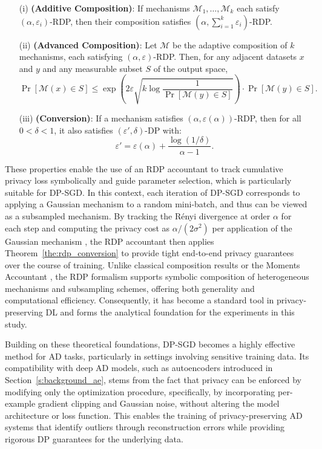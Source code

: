 \begin{theorem}\label{the:rdp_conversion}
\leavevmode
\begin{itemize}
    \item[(i)] \textbf{(Additive Composition)}: If mechanisms $\mathcal{M}_1, \ldots, \mathcal{M}_k$ each satisfy $(\alpha, \varepsilon_i)$-RDP, then their composition satisfies $(\alpha, \sum_{i=1}^k \varepsilon_i)$-RDP.
    \item[(ii)] \textbf{(Advanced Composition)}: Let $\mathcal{M}$ be the adaptive composition of $k$ mechanisms, each satisfying $(\alpha, \varepsilon)$-RDP. Then, for any adjacent datasets $x$ and $y$ and any measurable subset $S$ of the output space,
    \[
    \Pr[\mathcal{M}(x) \in S] \leq \exp\left(2 \varepsilon \sqrt{k \log \frac{1}{\Pr[\mathcal{M}(y) \in S]}}\right) \cdot \Pr[\mathcal{M}(y) \in S].
    \]
    \item[(iii)] \textbf{(Conversion)}: If a mechanism satisfies $(\alpha, \varepsilon(\alpha))$-RDP, then for all $0 < \delta < 1$, it also satisfies $(\varepsilon', \delta)$-DP with:
    \[
    \varepsilon' = \varepsilon(\alpha) + \frac{\log(1/\delta)}{\alpha - 1}.
    \]
\end{itemize}
\end{theorem}

These properties enable the use of an RDP accountant to track cumulative privacy loss symbolically and guide parameter selection, which is particularly suitable for DP-SGD. In this context, each iteration of DP-SGD corresponds to applying a Gaussian mechanism to a random mini-batch, and thus can be viewed as a subsampled mechanism. By tracking the Rényi divergence at order $\alpha$ for each step and computing the privacy cost as $\alpha / (2\sigma^2)$ per application of the Gaussian mechanism \citep{mironov2017renyi}, the RDP accountant then applies Theorem~\ref{the:rdp_conversion} to provide tight end-to-end privacy guarantees over the course of training. Unlike classical composition results or the Moments Accountant \citep{abadi2016deep}, the RDP formalism supports symbolic composition of heterogeneous mechanisms and subsampling schemes, offering both generality and computational efficiency. Consequently, it has become a standard tool in privacy-preserving DL and forms the analytical foundation for the experiments in this study.

Building on these theoretical foundations, DP-SGD becomes a highly effective method for AD tasks, particularly in settings involving sensitive training data. Its compatibility with deep AD models, such as autoencoders introduced in Section~\ref{s:background_ae}, stems from the fact that privacy can be enforced by modifying only the optimization procedure, specifically, by incorporating per-example gradient clipping and Gaussian noise, without altering the model architecture or loss function. This enables the training of privacy-preserving AD systems that identify outliers through reconstruction errors while providing rigorous DP guarantees for the underlying data.

